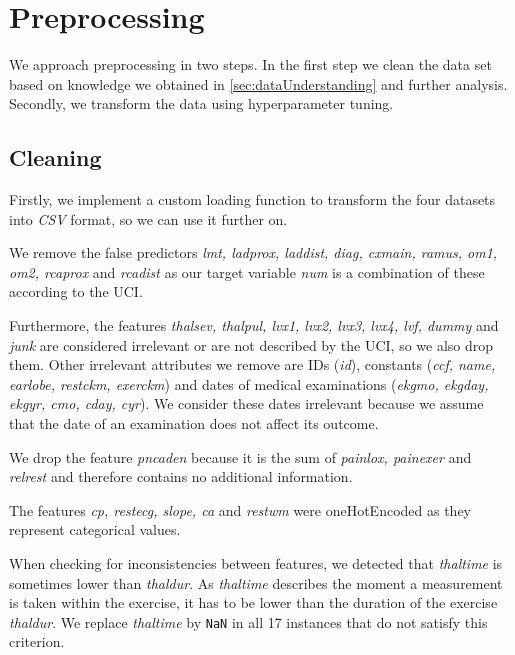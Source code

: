 \newpage
\section{Preprocessing} \label{sec:preprocessing}

We approach preprocessing in two steps. In the first step we clean the data set based on knowledge we obtained in \cref{sec:dataUnderstanding} and further analysis. 
Secondly, we transform the data using hyperparameter tuning.

\subsection{Cleaning}
Firstly, we implement a custom loading function to transform the four datasets into \emph{CSV} format, so we can use it further on.

We remove the false predictors \emph{lmt, ladprox, laddist, diag, cxmain, ramus, om1, om2, rcaprox} and \emph{rcadist}  as our target variable \emph{num} is a combination of these according to the UCI. %

Furthermore, the features \emph{thalsev, thalpul, lvx1, lvx2, lvx3, lvx4, lvf, dummy} and \emph{junk} are considered irrelevant or are not described by the UCI, so we also drop them. Other irrelevant attributes we remove are IDs (\emph{id}), constants (\emph{ccf, name, earlobe, restckm, exerckm}) and dates of medical examinations (\emph{ekgmo, ekgday, ekgyr, cmo, cday, cyr}). We consider these dates irrelevant because we assume that the date of  an examination does not affect its outcome. 

We drop the feature \emph{pncaden} because it is the sum of \emph{painlox, painexer} and \emph{relrest} and therefore contains no additional information. 

The features \emph{cp, restecg, slope, ca} and \emph{restwm} were oneHotEncoded as they represent categorical values.

When checking for inconsistencies between features, we detected that \emph{thaltime} is sometimes lower than \emph{thaldur}. As \emph{thaltime} describes the moment a measurement is taken within the exercise, it has to be lower than the duration of the exercise \emph{thaldur}. We replace \emph{thaltime} by \texttt{NaN} in all 17 instances that do not satisfy this criterion. 

